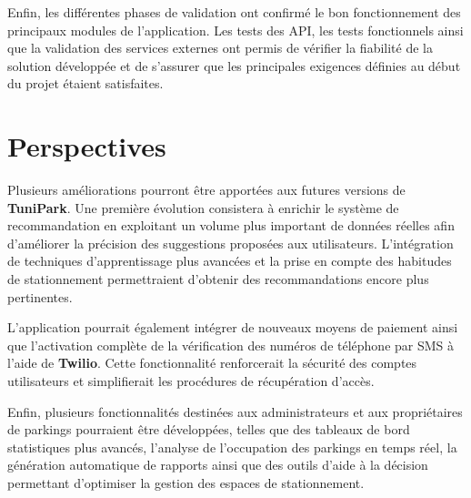 \par Enfin, les différentes phases de validation ont confirmé le bon fonctionnement des principaux modules de l'application. Les tests des API, les tests fonctionnels ainsi que la validation des services externes ont permis de vérifier la fiabilité de la solution développée et de s'assurer que les principales exigences définies au début du projet étaient satisfaites.

\section*{Perspectives}

\par Plusieurs améliorations pourront être apportées aux futures versions de \textbf{TuniPark}. Une première évolution consistera à enrichir le système de recommandation en exploitant un volume plus important de données réelles afin d'améliorer la précision des suggestions proposées aux utilisateurs. L'intégration de techniques d'apprentissage plus avancées et la prise en compte des habitudes de stationnement permettraient d'obtenir des recommandations encore plus pertinentes.


\par L'application pourrait également intégrer de nouveaux moyens de paiement ainsi que l'activation complète de la vérification des numéros de téléphone par SMS à l'aide de \textbf{Twilio}. Cette fonctionnalité renforcerait la sécurité des comptes utilisateurs et simplifierait les procédures de récupération d'accès.

\par Enfin, plusieurs fonctionnalités destinées aux administrateurs et aux propriétaires de parkings pourraient être développées, telles que des tableaux de bord statistiques plus avancés, l'analyse de l'occupation des parkings en temps réel, la génération automatique de rapports ainsi que des outils d'aide à la décision permettant d'optimiser la gestion des espaces de stationnement.